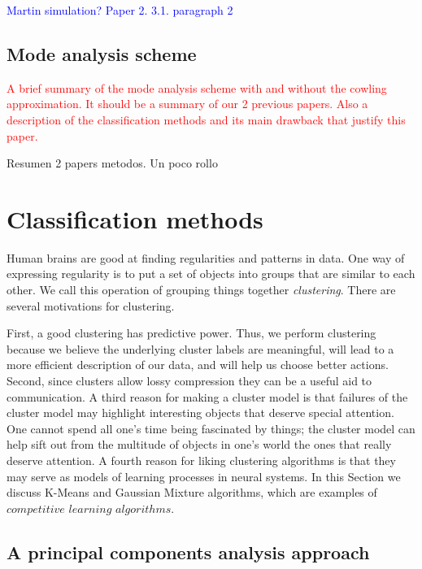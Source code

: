 \documentclass[fleqn,usenatbib]{mnras}
\begin{document}
\textcolor{blue}{Martin simulation? Paper 2. 3.1. paragraph 2}

\subsection{Mode analysis scheme}
\textcolor{red}{A brief summary of the mode analysis scheme with and without the cowling approximation. It should be a summary of our 2 previous papers. Also a description of the 
classification methods and its main drawback that justify this paper.}

Resumen 2 papers metodos. Un poco rollo

\section{Classification methods}

Human brains are good at finding regularities and patterns in data. One way of expressing regularity is to put a set of objects into groups that are similar to each other. We call this operation of grouping things together {\it clustering}. There are several motivations for clustering. 

First, a good clustering has predictive power. Thus, we perform clustering because we believe the underlying cluster labels are meaningful, will lead to a more efficient description of our data, and will help us choose better actions. Second, since clusters allow lossy compression they can be a useful aid to communication. 
A third reason for making a cluster model is that failures of the cluster model may highlight interesting objects that deserve special attention. One cannot spend all one’s time being fascinated by things; the cluster model can help sift out from the multitude of objects in one’s world the ones that really deserve attention. A fourth reason for liking clustering algorithms is that they may serve as models of learning processes in neural systems. In this Section we discuss K-Means and Gaussian Mixture algorithms, which are examples of $competitive$ $learning$ $algorithms$.

\subsection{A principal components analysis approach}
\end{document}
